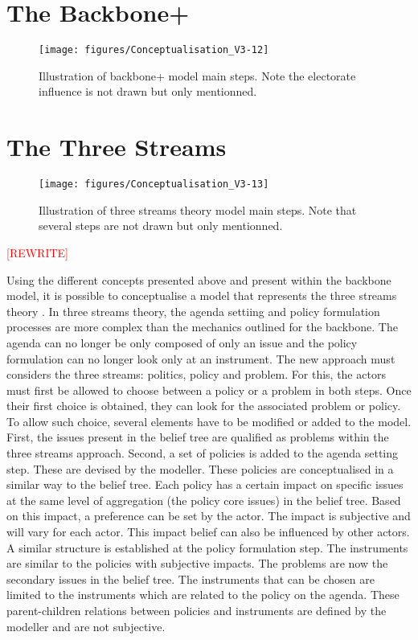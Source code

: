 %
\section{The Backbone+ }
\label{sec:backbone+}

\begin{figure}
\centering
\texttt{[image: figures/Conceptualisation\_V3-12]}
\caption{Illustration of backbone+ model main steps. Note the electorate influence is not drawn but only mentionned.}
\label{fig:Conceptualisation_V3-12}
\end{figure}


%
\section{The Three Streams}
\label{sec:3S}

\begin{figure}
\centering
\texttt{[image: figures/Conceptualisation\_V3-13]}
\caption{Illustration of three streams theory model main steps. Note that several steps are not drawn but only mentionned.}
\label{fig:Conceptualisation_V3-13}
\end{figure}

\textcolor{red}{[REWRITE]}

Using the different concepts presented above and present within the backbone model, it is possible to conceptualise a model that represents the three streams theory \citep{kingdon2003agendas, zahariadis2007multiple}. In three streams theory, the agenda settiing and policy formulation processes are more complex than the mechanics outlined for the backbone. The agenda can no longer be only composed of only an issue and the policy formulation can no longer look only at an instrument. The new approach must considers the three streams: politics, policy and problem.  For this, the actors must first be allowed to choose between a policy or a problem in both steps. Once their first choice is obtained, they can look for the associated problem or policy. To allow such choice, several elements have to be modified or added to the model. First, the issues present in the belief tree are qualified as problems within the three streams approach. Second, a set of policies is added to the agenda setting step. These are devised by the modeller. These policies are conceptualised in a similar way to the belief tree. Each policy has a certain impact on specific issues at the same level of aggregation (the policy core issues) in the belief tree. Based on this impact, a preference can be set by the actor. The impact is subjective and will vary for each actor. This impact belief can also be influenced by other actors. A similar structure is established at the policy formulation step. The instruments are similar to the policies with subjective impacts. The problems are now the secondary issues in the belief tree. The instruments that can be chosen are limited to the instruments which are related to the policy on the agenda. These parent-children relations between policies and instruments are defined by the modeller and are not subjective.
 
